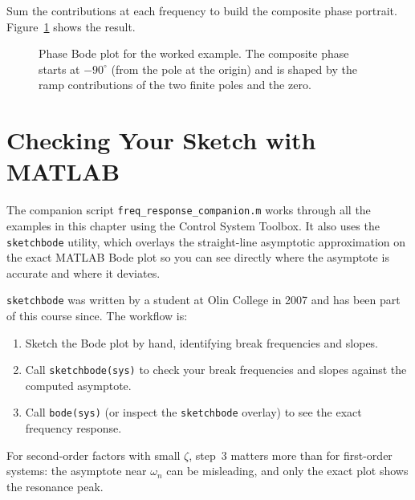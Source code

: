 \documentclass[../../book.tex]{subfiles}
\begin{document}
Sum the contributions at each frequency to build the composite phase portrait.
Figure~\ref{fig:example_phase} shows the result.

\begin{figure}[htbp]
  \caption{Phase Bode plot for the worked example.  The composite phase starts
    at $-90^\circ$ (from the pole at the origin) and is shaped by the ramp
    contributions of the two finite poles and the zero.}
  \label{fig:example_phase}
\end{figure}

\section{Checking Your Sketch with MATLAB}
\label{sec:matlab}

The companion script \texttt{freq\_response\_companion.m} works through all
the examples in this chapter using the Control System Toolbox.  It also uses
the \texttt{sketchbode} utility, which overlays the straight-line asymptotic
approximation on the exact MATLAB Bode plot so you can see directly where the
asymptote is accurate and where it deviates.

\texttt{sketchbode} was written by a student at Olin College in 2007 and has
been part of this course since.  The workflow is:
\begin{enumerate}
  \item Sketch the Bode plot by hand, identifying break frequencies and slopes.
  \item Call \texttt{sketchbode(sys)} to check your break frequencies and
    slopes against the computed asymptote.
  \item Call \texttt{bode(sys)} (or inspect the \texttt{sketchbode} overlay)
    to see the exact frequency response.
\end{enumerate}

For second-order factors with small $\zeta$, step~3 matters more than for
first-order systems: the asymptote near $\omega_n$ can be misleading, and
only the exact plot shows the resonance peak.
\end{document}
